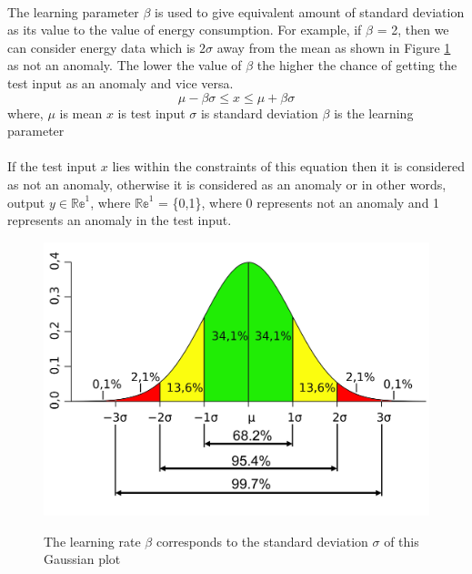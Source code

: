 \documentclass[12pt]{article}
\begin{document}
\paragraph{} The learning parameter $\beta$ is used to give equivalent amount of standard deviation as its value to the value of energy consumption. For example, if $\beta$ = 2, then we can consider energy data which is $2\sigma$ away from the mean as shown in Figure \ref{blockdiag} as not an anomaly. The lower the value of $\beta$ the higher the chance of getting the test input as an anomaly and vice versa. 
\begin{equation}
\label{equation_anomaly}
\mu-\beta\sigma \leq x \leq \mu + \beta\sigma
\end{equation}
where, \newline $\mu$ is mean \newline
$x$ is test input \newline
$\sigma$ is standard deviation \newline
$\beta$ is the learning parameter

\paragraph{}If the test input $x$ lies within the constraints of this equation then it is considered as not an anomaly, otherwise it is considered as an anomaly or in other words, output $y \in \mathbb{Re}^1$, where $\mathbb{Re}^1$ = \{0,1\}, where 0 represents not an anomaly and 1 represents an anomaly in the test input.

\begin{figure}[H]
	\centering
	{\includegraphics[scale=0.15]{Gaussian_bell.png}\label{blockdiag}
	}
	\caption[The Block Diagram of the designed application]{The learning rate $\beta$ corresponds to the standard deviation $\sigma$ of this Gaussian plot}
	\label{blockdiag}
	\hspace{0.7cm}%
\end{figure}
\end{document}

